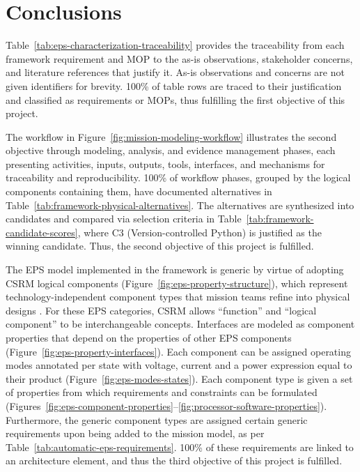 \chapter{Conclusions}
\label{ch:conclusions}

Table~\ref{tab:eps-characterization-traceability} provides the traceability from each framework requirement and MOP to the as-is observations, stakeholder concerns, and literature references that justify it.
As-is observations and concerns are not given identifiers for brevity.
100\% of table rows are traced to their justification and classified as requirements or MOPs, thus fulfilling the first objective of this project.

The workflow in Figure~\ref{fig:mission-modeling-workflow} illustrates the second objective through modeling, analysis, and evidence management phases, each presenting activities, inputs, outputs, tools, interfaces, and mechanisms for traceability and reproducibility.
100\% of workflow phases, grouped by the logical components containing them, have documented alternatives in Table~\ref{tab:framework-physical-alternatives}.
The alternatives are synthesized into candidates and compared via selection criteria in Table~\ref{tab:framework-candidate-scores}, where C3 (Version-controlled Python) is justified as the winning candidate.
Thus, the second objective of this project is fulfilled.

The EPS model implemented in the framework is generic by virtue of adopting CSRM logical components (Figure~\ref{fig:eps-property-structure}), which represent technology-independent component types that mission teams refine into physical designs \citep{kaslow2019csrm}.
For these EPS categories, CSRM allows ``function'' and ``logical component'' to be interchangeable concepts.
Interfaces are modeled as component properties that depend on the properties of other EPS components (Figure~\ref{fig:eps-property-interfaces}).
Each component can be assigned operating modes annotated per state with voltage, current and a power expression equal to their product (Figure~\ref{fig:eps-modes-states}).
Each component type is given a set of properties from which requirements and constraints can be formulated (Figures~\ref{fig:eps-component-properties}--\ref{fig:processor-software-properties}).
Furthermore, the generic component types are assigned certain generic requirements upon being added to the mission model, as per Table~\ref{tab:automatic-eps-requirements}.
100\% of these requirements are linked to an architecture element, and thus the third objective of this project is fulfilled.

